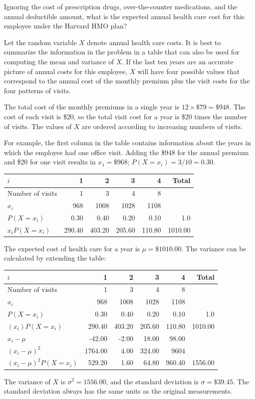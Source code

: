 \begin{example} {Ignoring the cost of prescription drugs, over-the-counter medications, and the annual deductible amount, what is the expected annual health care cost for this employee under the Harvard HMO plan?}  

Let the random variable $X$ denote annual health care costs.  It is best to summarize the information in the problem in a table that can also be used for computing the mean and variance of $X$.  If the  last ten years are an accurate picture of annual costs for this employee, $X$ will have four possible values that correspond to the annual cost of the monthly premium plus the visit costs for the four patterns of visits. 

The total cost of the monthly premiums in a single year is $12 \times \$79 = \$948$. The cost of each visit is \$20, so the total visit cost for a year is \$20 times the number of visits. The values of $X$ are ordered according to increasing numbers of visits. 

For example, the first column in the table contains information about the years in which the employee had one office visit. Adding the \$948 for the annual premium and \$20 for one visit results in $x_{1}=\$968$; $P(X=x_{i}) = 3/10 = 0.30$.

\begin{center}
\begin{tabular}{l rrrr r}
\hline
$i$ & 1 & 2 & 3 & 4 & Total \\
\hline
Number of visits & 1 & 3 & 4 & 8 &\\
$x_i$ & 968 & 1008 & 1028 & 1108 &  \\
$P(X=x_i)$ & 0.30 & 0.40 & 0.20 & 0.10 & 1.0 \\
$x_i P(X=x_i)$ & 290.40 & 403.20 & 205.60 & 110.80 & 1010.00 \\
\hline
\end{tabular}
\end{center}
The expected cost of health care for a year is $\mu=\$1010.00$. The variance can be calculated by extending the table:
\begin{center}
\begin{tabular}{l rrrr r}
\hline
$i$ & 1 & 2 & 3 & 4 & Total \\
\hline
Number of visits & 1 & 3 & 4 & 8 &\\
$x_i$ & 968 & 1008 & 1028 & 1108 &  \\
$P(X=x_i)$ & 0.30 & 0.40 & 0.20 & 0.10 & 1.0 \\
$(x_i)P(X=x_i)$ & 290.40 & 403.20 & 205.60 & 110.80 & 1010.00 \\
$x_i - \mu$ & -42.00  & -2.00  & 18.00  & 98.00 & \\
$(x_i - \mu)^2$ &  1764.00 & 4.00  & 324.00  & 9604 & \\
$(x_i - \mu)^2 P(X=x_i)$ & 529.20  & 1.60  & 64.80  & 960.40 & 1556.00\\
\hline
\end{tabular}
\end{center}
The variance of $X$ is $\sigma^2 = 1556.00$, and the standard deviation is $\sigma = \$39.45$.  The standard deviation always has the same units as the original measurements. 


\end{example}
